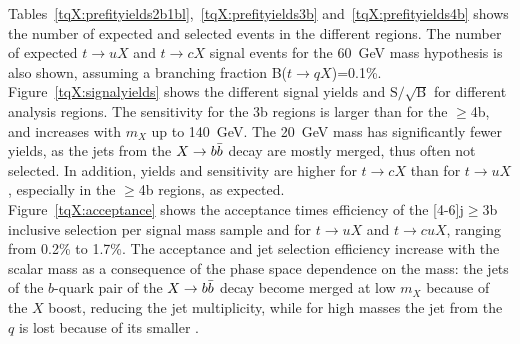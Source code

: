 Tables~\ref{tqX:prefityields2b1bl},~\ref{tqX:prefityields3b} and~\ref{tqX:prefityields4b} shows the number of expected and selected events in the different regions. The number of expected $t\to uX$ and $t\to cX$ signal events for the 60~GeV mass hypothesis is also shown, assuming a branching fraction B($t\to qX$)=0.1\%.\\

Figure~\ref{tqX:signalyields} shows the different signal yields and $\text{S}/\sqrt{\text{B}}$ for different analysis regions. The sensitivity for the 3b regions is larger than for the $\geq$4b, and increases with $m_{X}$ up to 140~GeV. The 20~GeV mass has significantly fewer yields, as the jets from the $X\to b\bar{b}$ decay are mostly merged, thus often not selected. In addition, yields and sensitivity are higher for $t\to cX$ than for $t\to uX$, especially in the $\geq$4b regions, as expected.\\

Figure~\ref{tqX:acceptance} shows the acceptance times efficiency of the [4-6]j$\geq$3b inclusive selection per signal mass sample and for $t\to uX$ and $t\to cuX$, ranging from 0.2\% to 1.7\%. The acceptance and jet selection efficiency increase with the scalar mass as a consequence of the phase space dependence on the mass: the jets of the $b$-quark pair of the $X\to b\bar{b}$ decay become merged at low $m_X$ because of the $X$ boost, reducing the jet multiplicity, while for high masses the jet from the $q$ is lost because of its smaller \pT.\\

